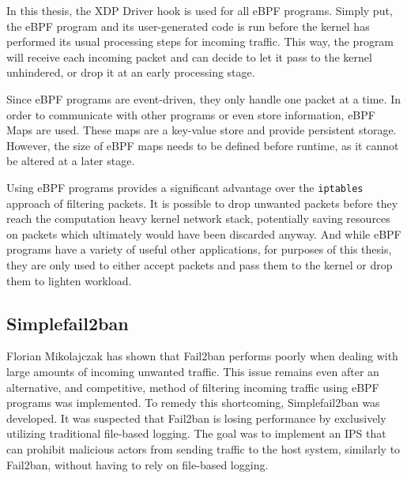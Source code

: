 In this thesis, the \ac{XDP} Driver hook is used for all \ac{eBPF} programs.
Simply put, the \ac{eBPF} program and its user-generated code is run before the kernel has performed its usual processing steps for incoming traffic.
This way, the program will receive each incoming packet and can decide to let it pass to the kernel unhindered, or drop it at an early processing stage.

Since \ac{eBPF} programs are event-driven, they only handle one packet at a time.
In order to communicate with other programs or even store information, \ac{eBPF} Maps are used.
These maps are a key-value store and provide persistent storage.
However, the size of \ac{eBPF} maps needs to be defined before runtime, as it cannot be altered at a later stage.\cite{mikolajczak:ebpf}

Using \ac{eBPF} programs provides a significant advantage over the \texttt{iptables} approach of filtering packets.
It is possible to drop unwanted packets before they reach the computation heavy kernel network stack, potentially saving resources on packets which ultimately would have been discarded anyway.
And while \ac{eBPF} programs have a variety of useful other applications, for purposes of this thesis, they are only used to either accept packets and pass them to the kernel or drop them to lighten workload.

\subsection{Simplefail2ban}
Florian Mikolajczak has shown\cite{mikolajczak:ebpf} that Fail2ban performs poorly when dealing with large amounts of incoming unwanted traffic.
This issue remains even after an alternative, and competitive, method of filtering incoming traffic using \ac{eBPF} programs was implemented.
To remedy this shortcoming, Simplefail2ban was developed\cite{raatschen:ipc}.
It was suspected that Fail2ban is losing performance by exclusively utilizing traditional file-based logging.
The goal was to implement an \ac{IPS} that can prohibit malicious actors from sending traffic to the host system, similarly to Fail2ban, without having to rely on file-based logging.

